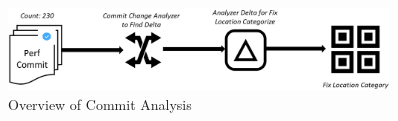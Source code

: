 \begin{figure}[t]
	\centering
	\includegraphics[width=0.9\textwidth]{figure/commitanalysis.eps}
	\caption{Overview of Commit Analysis}
	\label{figure:commitanalysis}
\end{figure}
